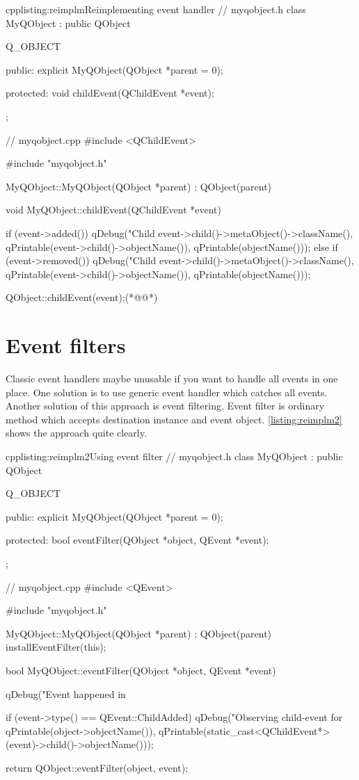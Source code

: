 \begin{fdoccode}{cpp}{listing:reimplm}{Reimplementing event handler}
// myqobject.h
class MyQObject : public QObject{
	Q_OBJECT

    public:
		explicit MyQObject(QObject *parent = 0);

    protected:
		void childEvent(QChildEvent *event);
};

// myqobject.cpp
#include <QChildEvent>

#include "myqobject.h"


MyQObject::MyQObject(QObject *parent) : QObject(parent) {
}

void MyQObject::childEvent(QChildEvent *event) {
    if (event->added()) {
		qDebug("Child %
	       	event->child()->metaObject()->className(),
	       	qPrintable(event->child()->objectName()),
	       	qPrintable(objectName()));
    }
    else if (event->removed()) {
		qDebug("Child %
	       	event->child()->metaObject()->className(),
	       	qPrintable(event->child()->objectName()),
	       	qPrintable(objectName()));
    }

    QObject::childEvent(event);(*@\label{listing:handl}@*)
}
\end{fdoccode}

\section{Event filters}
Classic event handlers maybe unusable if you want to handle all events in one place. One solution is to use generic event handler which catches all events. Another solution of this approach is event filtering. Event filter is ordinary method which accepts destination instance and event object. \autoref{listing:reimplm2} shows the approach quite clearly.

\begin{fdoccode}{cpp}{listing:reimplm2}{Using event filter}
// myqobject.h
class MyQObject : public QObject {
	Q_OBJECT

    public:
		explicit MyQObject(QObject *parent = 0);

    protected:
		bool eventFilter(QObject *object, QEvent *event);
};

// myqobject.cpp
#include <QEvent>

#include "myqobject.h"


MyQObject::MyQObject(QObject *parent) : QObject(parent) {
    installEventFilter(this);
}

bool MyQObject::eventFilter(QObject *object, QEvent *event) {
    qDebug("Event happened in %

    if (event->type() == QEvent::ChildAdded) {
				qDebug("Observing child-event for %
	      qPrintable(object->objectName()),
	      qPrintable(static_cast<QChildEvent*>(event)->child()->objectName()));
    }

    return QObject::eventFilter(object, event);
}
\end{fdoccode}

